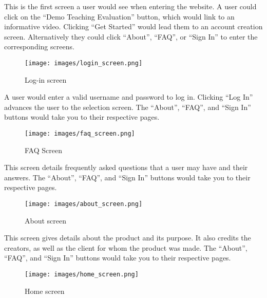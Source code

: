 \documentclass{article}
\begin{document}
This is the first screen a user would see when entering the website. A user could click on the ``Demo Teaching Evaluation'' button, which would link to an informative video. Clicking ``Get Started'' would lead them to an account creation screen. Alternatively they could click ``About'', ``FAQ'', or ``Sign In'' to enter the corresponding screens.

\newpage

\begin{center}
\begin{figure}[H]
    \centering
    \caption{Log-in screen}
    \texttt{[image: images/login\_screen.png]}
\end{figure}
\end{center}

A user would enter a valid username and password to log in. Clicking ``Log In'' advances the user to the selection screen. The ``About'', ``FAQ'', and ``Sign In'' buttons would take you to their respective pages.

\newpage

\begin{center}
\begin{figure}[H]
    \centering
    \caption{FAQ Screen}
    \texttt{[image: images/faq\_screen.png]}
\end{figure}
\end{center}

This screen details frequently asked questions that a user may have and their answers. The ``About'', ``FAQ'', and ``Sign In'' buttons would take you to their respective pages.

\newpage

\begin{center}
\begin{figure}[H]
    \centering
    \caption{About screen}
    \texttt{[image: images/about\_screen.png]}
\end{figure}
\end{center}

This screen gives details about the product and its purpose. It also credits the creators, as well as the client for whom the product was made. The ``About'', ``FAQ'', and ``Sign In'' buttons would take you to their respective pages.

\newpage

\begin{center}
\begin{figure}[H]
    \centering
    \caption{Home screen}
    \texttt{[image: images/home\_screen.png]}
\end{figure}
\end{center}
\end{document}
